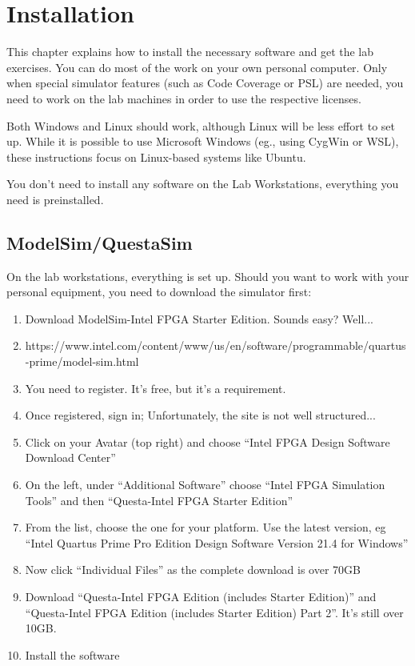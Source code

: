 \documentclass[12pt,epsf,makeidx,oneside]{book}
\begin{document}
\chapter{Installation}
This chapter explains how to install the necessary software and get the lab exercises. You can do most of the work on your own personal computer. Only when special simulator features (such as Code Coverage or PSL) are needed, you need to work on the lab machines in order to use the respective licenses. 

Both Windows and Linux should work, although Linux will be less effort to set up. While it is possible to use Microsoft Windows (eg., using CygWin or WSL), these instructions focus on Linux-based systems like Ubuntu. 

You don't need to install any software on the Lab Workstations, everything you need is preinstalled.

\section{ModelSim/QuestaSim}
  On the lab workstations, everything is set up. Should you want to work with your personal equipment, you need to download the simulator first:
  \begin{enumerate}[noitemsep]
    \item Download ModelSim-Intel FPGA Starter Edition. Sounds easy? Well...
    \item https://www.intel.com/content/www/us/en/software/programmable/quartus-prime/model-sim.html
    \item You need to register. It's free, but it's a requirement.
    \item Once registered, sign in; Unfortunately, the site is not well structured...
    \item Click on your Avatar (top right) and choose ``Intel FPGA Design Software Download Center''
    \item On the left, under ``Additional Software'' choose ``Intel FPGA Simulation Tools'' and then ``Questa-Intel FPGA Starter Edition''
    \item From the list, choose the one for your platform. Use the latest version, eg ``Intel Quartus Prime Pro Edition Design Software Version 21.4 for Windows''
    \item Now click ``Individual Files'' as the complete download is over 70GB
    \item Download ``Questa-Intel FPGA Edition (includes Starter Edition)'' and ``Questa-Intel FPGA Edition (includes Starter Edition) Part 2''. It's still over 10GB.
    \item Install the software
  \end{enumerate}
\end{document}
